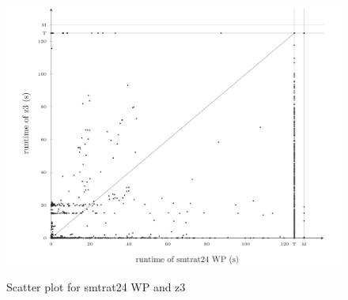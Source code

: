 \begin{figure}[]
    \centering
    \caption{Scatter plot for smtrat24 WP and z3}
    \includegraphics[width=1\linewidth]{./figures/scatter-smtrat_24_preprocessing-z3.pdf}
    \label{fig:Scatter_plot_for_smtrat24_WP_and_z3}
\end{figure}


